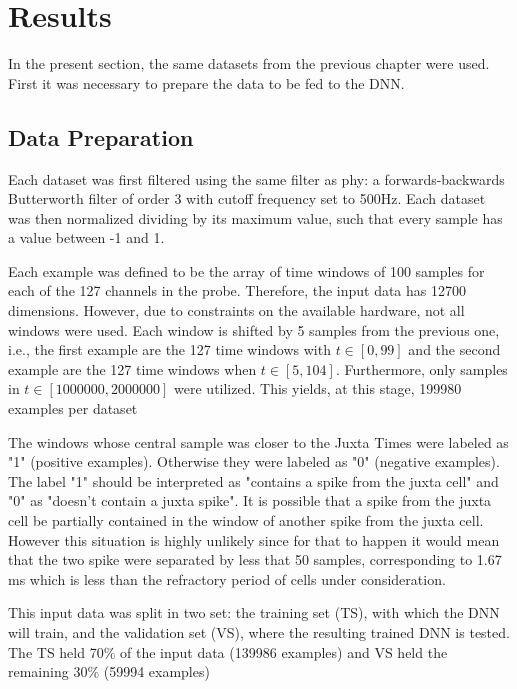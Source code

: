 \section{Results}
\label{sec:DL-results}


In the present section, the same datasets from the previous chapter were used. 
First it was necessary to prepare the data to be fed to the DNN.
\subsection{Data Preparation}
Each dataset was first filtered using the same filter as phy: a forwards-backwards Butterworth filter of order 3 with cutoff frequency set to 500Hz. Each dataset was then normalized dividing by its maximum value, such that every sample has a value between -1 and 1.

Each example was defined to be the array of time windows of 100 samples for each of the 127 channels in the probe. Therefore, the input data has 12700 dimensions. However, due to constraints on the available hardware, not all windows were used. Each window is shifted by 5 samples from the previous one, i.e., the first example are the 127 time windows with $t \in [ 0 , 99]$ and the second example are the 127 time windows when $t \in [ 5, 104]$. Furthermore, only samples in $t \in [1000000,2000000]$ were utilized. This yields, at this stage, 199980 examples per dataset

The windows whose central sample was closer to the Juxta Times were labeled as "1" (positive examples). Otherwise they were labeled as "0" (negative examples). The label "1" should be interpreted as "contains a spike from the juxta cell" and "0" as "doesn't contain a juxta spike". It is possible that a spike from the juxta cell be partially contained in the window of another spike from the juxta cell. However this situation is highly unlikely since for that to happen it would mean that the two spike were separated by less that 50 samples, corresponding to 1.67 ms which is less than the refractory period of cells under consideration.

This input data was split in two set: the training set (TS), with which the DNN will train, and the validation set (VS), where the resulting trained DNN is tested. The TS held 70\% of the input data (139986 examples) and VS held the remaining 30\% (59994 examples)

